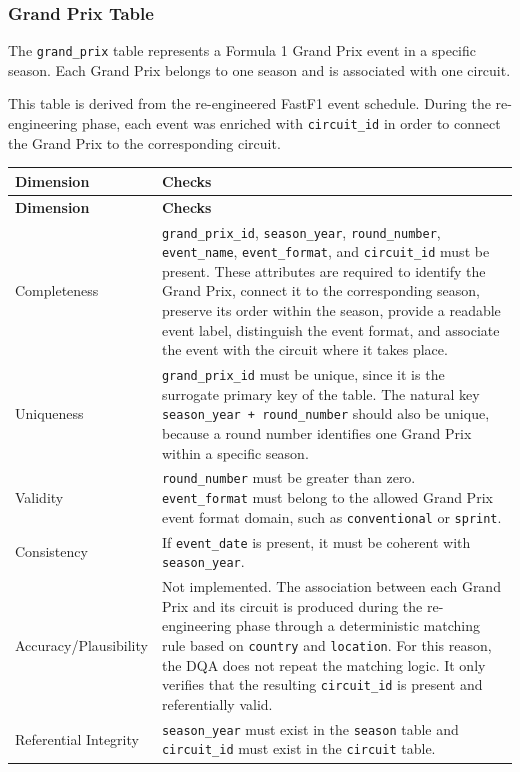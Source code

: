 \documentclass[a4paper,11pt]{article}
\begin{document}
	
	\subsubsection{Grand Prix Table}
	
	The \texttt{grand\_prix} table represents a Formula 1 Grand Prix event in a
	specific season. Each Grand Prix belongs to one season and is associated with
	one circuit.
	
	This table is derived from the re-engineered FastF1 event schedule. During the
	re-engineering phase, each event was enriched with \texttt{circuit\_id} in order to
	connect the Grand Prix to the corresponding circuit.
	
	\begin{longtable}{p{3.5cm}p{11cm}}
		\toprule
		\textbf{Dimension} & \textbf{Checks} \\
		\midrule
		\endfirsthead
		
		\toprule
		\textbf{Dimension} & \textbf{Checks} \\
		\midrule
		\endhead
		
		Completeness
		& \texttt{grand\_prix\_id}, \texttt{season\_year},
		\texttt{round\_number}, \texttt{event\_name},
		\texttt{event\_format}, and \texttt{circuit\_id} must be present.
		These attributes are required to identify the Grand Prix, connect it to the
		corresponding season, preserve its order within the season, provide a readable
		event label, distinguish the event format, and associate the event with the
		circuit where it takes place. \\
		\midrule
		
		Uniqueness
		& \texttt{grand\_prix\_id} must be unique, since it is the surrogate primary
		key of the table. The natural key \texttt{season\_year + round\_number}
		should also be unique, because a round number identifies one Grand Prix
		within a specific season. \\
		\midrule
		
		Validity
		& \texttt{round\_number} must be greater than zero.
		\texttt{event\_format} must belong to the allowed Grand Prix event format
		domain, such as \texttt{conventional} or \texttt{sprint}. \\
		\midrule
		
		Consistency
		& If \texttt{event\_date} is present, it must be coherent with
		\texttt{season\_year}. \\
		\midrule
		
		Accuracy/Plausibility
		& Not implemented. The association between each
		Grand Prix and its circuit is produced during the re-engineering phase through
		a deterministic matching rule based on \texttt{country} and \texttt{location}.
		For this reason, the DQA does not repeat the matching logic. It only verifies
		that the resulting \texttt{circuit\_id} is present and referentially valid. \\
		\midrule
		
		Referential Integrity
		& \texttt{season\_year} must exist in the \texttt{season} table and
		\texttt{circuit\_id} must exist in the \texttt{circuit} table.\\
		\bottomrule
	\end{longtable}
	
\end{document}
